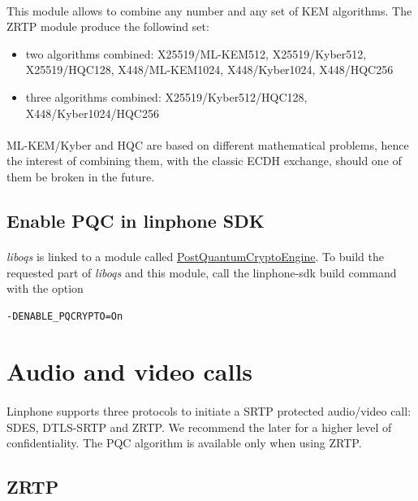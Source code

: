\documentclass[a4paper,11pt]{article}
\begin{document}
\paragraph*{}This module allows to combine any number and any set of KEM algorithms. The ZRTP module produce the followind set:
\begin{itemize}
  \item two algorithms combined: X25519/ML-KEM512, X25519/Kyber512, X25519/HQC128, X448/ML-KEM1024, X448/Kyber1024, X448/HQC256
  \item three algorithms combined: X25519/Kyber512/HQC128, X448/Kyber1024/HQC256
\end{itemize}
\paragraph*{}ML-KEM/Kyber and HQC are based on different mathematical problems, hence the interest of combining them, with the classic ECDH exchange, should one of them be broken in the future.

\subsection{Enable PQC in linphone SDK}
\paragraph*{}\textit{liboqs} is linked to a module called \href{https://gitlab.linphone.org/BC/public/linphone-sdk/-/tree/master/postquantumcryptoengine}{PostQuantumCryptoEngine}. To build the requested part of \textit{liboqs} and this module, call the linphone-sdk build command with the option
\lstset{language=bash}
\begin{lstlisting}
-DENABLE_PQCRYPTO=On
\end{lstlisting}

\newpage
\section{Audio and video calls}
\paragraph*{}Linphone supports three protocols to initiate a SRTP protected audio/video call: SDES, DTLS-SRTP and ZRTP. We recommend the later for a higher level of confidentiality. The PQC algorithm is available only when using ZRTP\citep{rfc6189}.
\subsection{ZRTP}
\end{document}
